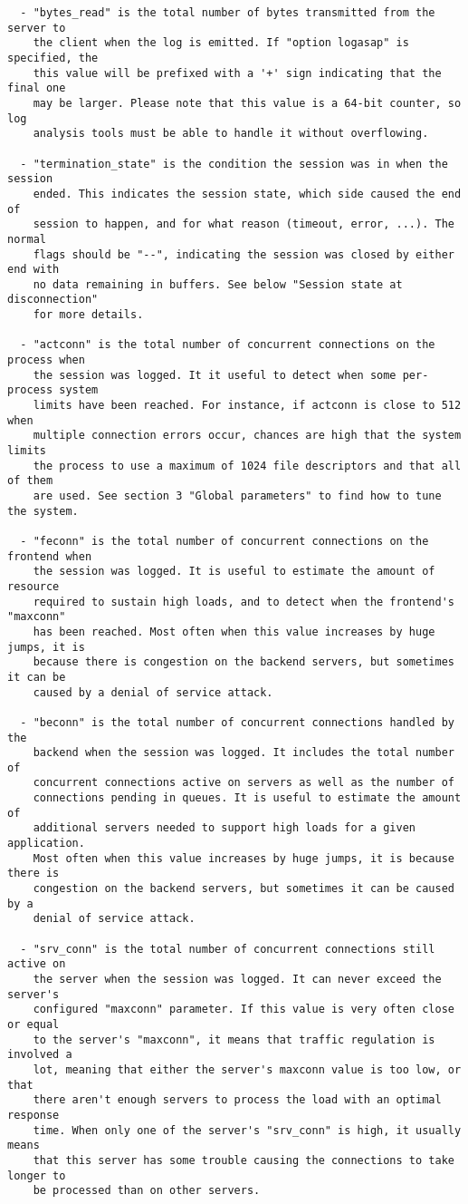 \begin{verbatim}
  - "bytes_read" is the total number of bytes transmitted from the server to
    the client when the log is emitted. If "option logasap" is specified, the
    this value will be prefixed with a '+' sign indicating that the final one
    may be larger. Please note that this value is a 64-bit counter, so log
    analysis tools must be able to handle it without overflowing.

  - "termination_state" is the condition the session was in when the session
    ended. This indicates the session state, which side caused the end of
    session to happen, and for what reason (timeout, error, ...). The normal
    flags should be "--", indicating the session was closed by either end with
    no data remaining in buffers. See below "Session state at disconnection"
    for more details.

  - "actconn" is the total number of concurrent connections on the process when
    the session was logged. It it useful to detect when some per-process system
    limits have been reached. For instance, if actconn is close to 512 when
    multiple connection errors occur, chances are high that the system limits
    the process to use a maximum of 1024 file descriptors and that all of them
    are used. See section 3 "Global parameters" to find how to tune the system.

  - "feconn" is the total number of concurrent connections on the frontend when
    the session was logged. It is useful to estimate the amount of resource
    required to sustain high loads, and to detect when the frontend's "maxconn"
    has been reached. Most often when this value increases by huge jumps, it is
    because there is congestion on the backend servers, but sometimes it can be
    caused by a denial of service attack.

  - "beconn" is the total number of concurrent connections handled by the
    backend when the session was logged. It includes the total number of
    concurrent connections active on servers as well as the number of
    connections pending in queues. It is useful to estimate the amount of
    additional servers needed to support high loads for a given application.
    Most often when this value increases by huge jumps, it is because there is
    congestion on the backend servers, but sometimes it can be caused by a
    denial of service attack.

  - "srv_conn" is the total number of concurrent connections still active on
    the server when the session was logged. It can never exceed the server's
    configured "maxconn" parameter. If this value is very often close or equal
    to the server's "maxconn", it means that traffic regulation is involved a
    lot, meaning that either the server's maxconn value is too low, or that
    there aren't enough servers to process the load with an optimal response
    time. When only one of the server's "srv_conn" is high, it usually means
    that this server has some trouble causing the connections to take longer to
    be processed than on other servers.


\end{verbatim}
